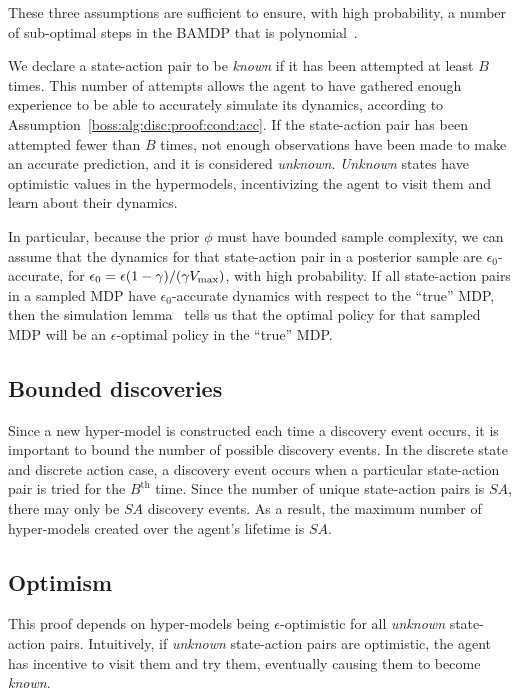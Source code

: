 These three assumptions are sufficient to ensure, with high probability, a number of sub-optimal steps in the BAMDP that is polynomial~\cite{lihong09pacmdp}.

We declare a state-action pair to be \emph{known} if it has been attempted at least $B$ times. This number of attempts allows the agent to have gathered enough experience to be able to accurately simulate its dynamics, according to Assumption~\ref{boss:alg:disc:proof:cond:acc}. If the state-action pair has been attempted fewer than $B$ times, not enough observations have been made to make an accurate prediction, and it is considered \emph{unknown}. \emph{Unknown} states have optimistic values in the hypermodels, incentivizing the agent to visit them and learn about their dynamics.

In particular, because the prior $\phi$ must have bounded sample complexity, we can assume that the dynamics for that state-action pair in a posterior sample are $\epsilon_0$-accurate, for $\epsilon_0 = \epsilon(1-\gamma)/(\gamma V_{\rm max})$, with high probability. If all state-action pairs in a sampled MDP have $\epsilon_0$-accurate dynamics with respect to the ``true'' MDP, then the simulation lemma~\cite{kearns98,lihong09simlemma} tells us that the optimal policy for that sampled MDP will be an $\epsilon$-optimal policy in the ``true'' MDP.



\subsection{Bounded discoveries}

Since a new hyper-model is constructed each time a discovery event occurs, it is important to bound the number of possible discovery events. In the discrete state and discrete action case, a discovery event occurs when a particular state-action pair is tried for the $B^{\mbox{th}}$ time. Since the number of unique state-action pairs is $S A$, there may only be $S A$ discovery events. As a result, the maximum number of hyper-models created over the agent's lifetime is $S A$.

\subsection{Optimism}
\label{boss:alg:disc:proof:opt}

This proof depends on hyper-models being $\epsilon$-optimistic for all \emph{unknown} state-action pairs. Intuitively, if \emph{unknown} state-action pairs are optimistic, the agent has incentive to visit them and try them, eventually causing them to become \emph{known}.

